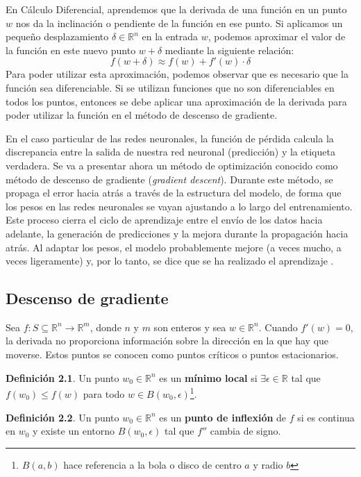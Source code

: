 En Cálculo Diferencial, aprendemos que la derivada de una función en un punto $w$ nos da la inclinación o pendiente de la función en ese punto. Si aplicamos un pequeño desplazamiento $\delta \in \mathbb{R}^n$ en la entrada $w$, podemos aproximar el valor de la función en este nuevo punto $w + \delta$ mediante la siguiente relación: 
\begin{equation}
    f(w + \delta) \approx f(w) + f'(w)\cdot \delta
\end{equation}
Para poder utilizar esta aproximación, podemos observar que es necesario que la función sea diferenciable. Si se utilizan funciones que no son diferenciables en todos los puntos,  entonces se debe aplicar una aproximación de la derivada para poder utilizar la función en el método de descenso de gradiente. 


En el caso particular de las redes neuronales, la función de pérdida calcula la discrepancia entre la salida de nuestra red neuronal (predicción) y la etiqueta verdadera. Se va a presentar ahora un método de optimización conocido como método de descenso de gradiente (\textit{gradient descent}). Durante este método, se propaga el error hacia atrás a través de la estructura del modelo, de forma que los pesos en las redes neuronales se vayan ajustando a lo largo del entrenamiento. Este proceso cierra el ciclo de aprendizaje entre el envío de los datos hacia adelante, la generación de predicciones y la mejora durante la propagación hacia atrás. Al adaptar los pesos, el modelo probablemente mejore (a veces mucho, a veces ligeramente) y, por lo tanto, se dice que se ha realizado el aprendizaje \citep{pajares2021aprendizaje}. 


\subsection{Descenso de gradiente}


Sea $f: S \subseteq \mathbb{R}^n \to \mathbb{R}^m$, donde $n$ y $m$ son enteros y sea $w \in \mathbb{R}^n$. Cuando $f'(w) = 0$, la derivada no proporciona información sobre la dirección en la que hay que moverse. Estos puntos se conocen como puntos críticos o puntos estacionarios. 

\textbf{Definición 2.1}. Un punto $w_0 \in \mathbb{R}^n$ es un \textbf{mínimo local} si $\exists \epsilon \in \mathbb{R}$ tal que $f(w_0) \leq f(w)$ para todo $w \in B(w_0, \epsilon)$\footnote{$B(a,b)$ hace referencia a la bola o disco de centro $a$ y radio $b$}. 

\textbf{Definición 2.2}. Un punto \( w_0 \in \mathbb{R}^n \) es un \textbf{punto de inflexión} de \( f \) si es continua en \( w_0 \) y existe un entorno \( B(w_0, \epsilon) \) tal que \( f'' \) cambia de signo. 


